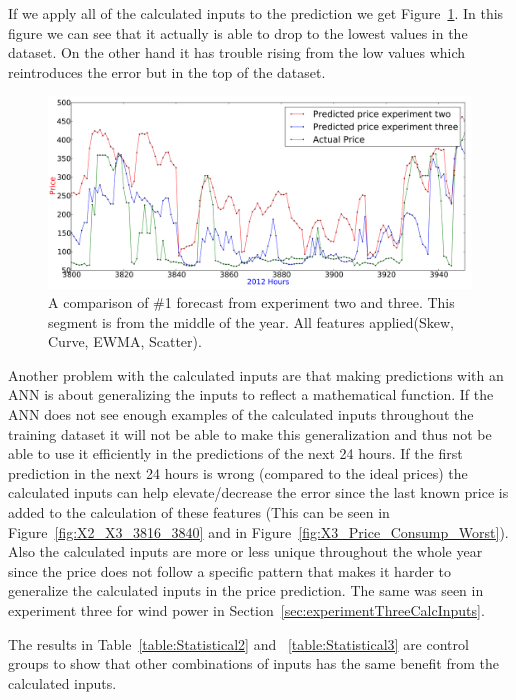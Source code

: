 If we apply all of the calculated inputs to the prediction we get Figure~\ref{fig:X2_X3_AllParameters_3800_4000}. In this figure we can see that it actually is able to drop to the lowest values in the dataset. On the other hand it has trouble rising from the low values which reintroduces the error but in the top of the dataset.

\begin{figure}[H]
\centering
\includegraphics[width=\linewidth]{billeder/PriceExperimentalAnalysis/X2_X3_AllFeatures_3800_4000.png}
\caption{A comparison of \#1 forecast from experiment two and three. This segment is from the middle of the year. All features applied(Skew, Curve, EWMA, Scatter).}
\label{fig:X2_X3_AllParameters_3800_4000}
\end{figure}

Another problem with the calculated inputs are that making predictions with an ANN is about generalizing the inputs to reflect a mathematical function. If the ANN does not see enough examples of the calculated inputs throughout the training dataset it will not be able to make this generalization and thus not be able to use it efficiently in the predictions of the next 24 hours. If the first prediction in the next 24 hours is wrong (compared to the ideal prices) the calculated inputs can help elevate/decrease the error since the last known price is added to the calculation of these features (This can be seen in Figure~\ref{fig:X2_X3_3816_3840} and in Figure~\ref{fig:X3_Price_Consump_Worst}). Also the calculated inputs are more or less unique throughout the whole year since the price does not follow a specific pattern that makes it harder to generalize the calculated inputs in the price prediction. The same was seen in experiment three for wind power in Section~\ref{sec:experimentThreeCalcInputs}.

The results in Table~\ref{table:Statistical2} and ~\ref{table:Statistical3} are control groups to show that other combinations of inputs has the same benefit from the calculated inputs.

